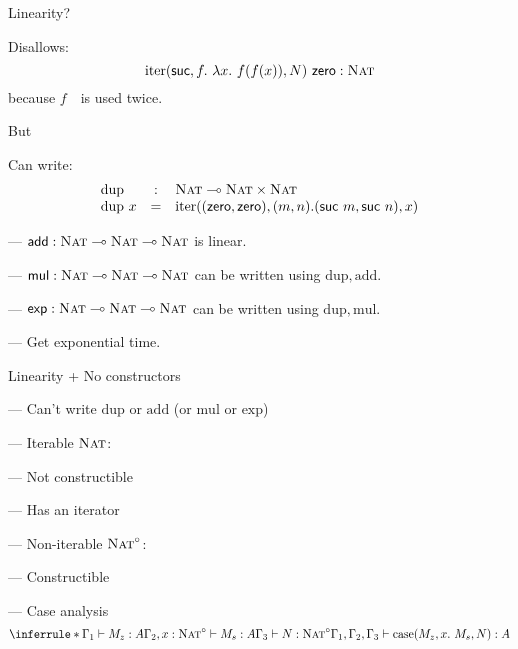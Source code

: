\documentclass[xetex,serif,mathserif,aspectratio=169]{beamer}
\newcommand{\youtem}{\quad \textcolor{titlered!80}{---} \quad}
\newcommand{\HEAD}[1]{\textcolor{titlered}{#1}}
\begin{document}
\begin{frame}

  \HEAD{Linearity?}

  \medskip

  Disallows:
  \begin{displaymath}
    \mathrm{iter}(\mathsf{suc},f.~\lambda x.~f(f(x)),N)~\mathsf{zero} : \textsc{Nat}
  \end{displaymath}
  because $f$~~is used twice.

  \pause

  \bigskip

  \HEAD{But}

  Can write:
  \begin{displaymath}
    \begin{array}{lcl}
      \mathrm{dup} & : & \textsc{Nat} \multimap \textsc{Nat} \times \textsc{Nat} \\
      \mathrm{dup}~x  &=&\mathrm{iter}((\mathsf{zero},\mathsf{zero}), (m,n). (\mathsf{suc}~m, \mathsf{suc}~n), x)
    \end{array}
  \end{displaymath}

  \pause
  \youtem $\mathsf{add} : \textsc{Nat} \multimap \textsc{Nat} \multimap \textsc{Nat}$ is linear.

  \pause
  \youtem $\mathsf{mul} : \textsc{Nat} \multimap \textsc{Nat} \multimap \textsc{Nat}$ can be written using $\mathrm{dup}, \mathrm{add}$.

  \pause
  \youtem $\mathsf{exp} : \textsc{Nat} \multimap \textsc{Nat} \multimap \textsc{Nat}$ can be written using $\mathrm{dup}, \mathrm{mul}$.

  \pause
  \youtem Get exponential time.

\end{frame}

\begin{frame}
  \HEAD{Linearity + No constructors}

  \medskip

  \youtem Can't write $\mathrm{dup}$ or $\mathrm{add}$ (or $\mathrm{mul}$ or $\mathrm{exp}$)

  \pause
  \bigskip

  \youtem Iterable $\textsc{Nat}$:

  \quad \youtem Not constructible

  \quad \youtem Has an iterator

  \pause
  \bigskip

  \youtem Non-iterable $\textsc{Nat}^\circ$:

  \quad \youtem Constructible

  \quad \youtem Case analysis
  \begin{displaymath}
    \inferrule*
    {\Gamma_1 \vdash M_z : A \\ \Gamma_2, x : \TyNat^\circ \vdash M_s : A \\ \Gamma_3 \vdash N : \TyNat^\circ}
    {\Gamma_1, \Gamma_2, \Gamma_3 \vdash \mathrm{case}(M_z, x.~M_s, N) : A}
  \end{displaymath}

\end{frame}
\end{document}
